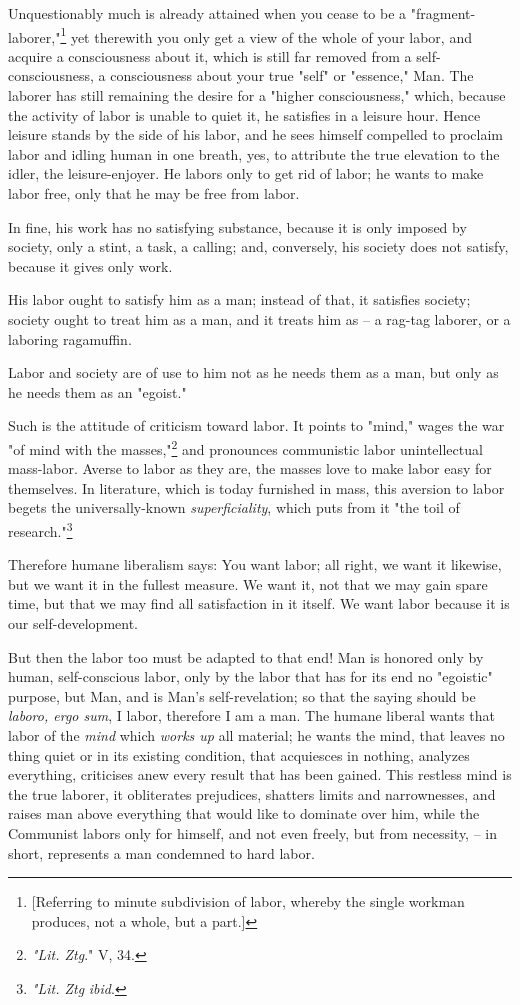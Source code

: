 \documentclass[a4paper]{book}
\begin{document}
Unquestionably much is already attained when you cease to be a 
"{}fragment-laborer,"{}\footnote{[Referring to minute subdivision of labor, 
whereby the single workman produces, not a whole, but a part.]} yet therewith 
you only get a view of the whole of your labor, and acquire a consciousness 
about it, which is still far removed from a self-consciousness, a 
consciousness about your true "{}self"{} or "{}essence,"{} Man. The laborer 
has still remaining the desire for a "{}higher consciousness,"{} which, 
because the activity of labor is unable to quiet it, he satisfies in a leisure 
hour. Hence leisure stands by the side of his labor, and he sees himself 
compelled to proclaim labor and idling human in one breath, yes, to attribute 
the true elevation to the idler, the leisure-enjoyer. He labors only to get 
rid of labor; he wants to make labor free, only that he may be free from 
labor.

In fine, his work has no satisfying substance, because it is only imposed by 
society, only a stint, a task, a calling; and, conversely, his society does 
not satisfy, because it gives only work.

His labor ought to satisfy him as a man; instead of that, it satisfies 
society; society ought to treat him as a man, and it treats him as -- a 
rag-tag laborer, or a laboring ragamuffin.

Labor and society are of use to him not as he needs them as a man, but only as 
he needs them as an "{}egoist."{}

Such is the attitude of criticism toward labor. It points to "{}mind,"{} wages 
the war "{}of mind with the masses,"{}\footnote{\textit{"{}Lit. Ztg}."{} V, 
34.} and pronounces communistic labor unintellectual mass-labor. Averse to 
labor as they are, the masses love to make labor easy for themselves. In 
literature, which is today furnished in mass, this aversion to labor begets 
the universally-known \textit{superficiality}, which puts from it "{}the toil 
of research."{}\footnote{\textit{"{}Lit. Ztg} \textit{ibid}.}

Therefore humane liberalism says: You want labor; all right, we want it 
likewise, but we want it in the fullest measure. We want it, not that we may 
gain spare time, but that we may find all satisfaction in it itself. We want 
labor because it is our self-development.

But then the labor too must be adapted to that end! Man is honored only by 
human, self-conscious labor, only by the labor that has for its end no 
"{}egoistic"{} purpose, but Man, and is Man's self-revelation; so that the 
saying should be \textit{laboro, ergo sum}, I labor, therefore I am a man. The 
humane liberal wants that labor of the \textit{mind} which \textit{works up} 
all material; he wants the mind, that leaves no thing quiet or in its existing 
condition, that acquiesces in nothing, analyzes everything, criticises anew 
every result that has been gained. This restless mind is the true laborer, it 
obliterates prejudices, shatters limits and narrownesses, and raises man above 
everything that would like to dominate over him, while the Communist labors 
only for himself, and not even freely, but from necessity, -- in short, 
represents a man condemned to hard labor.
\end{document}
